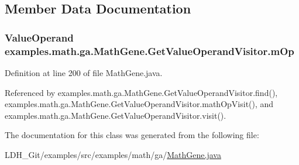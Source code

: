 \subsection{Member Data Documentation}
\hypertarget{classexamples_1_1math_1_1ga_1_1_math_gene_1_1_get_value_operand_visitor_a08a1e2848b038e456b47e8f698fdc182}{
\subsubsection[{m\-Op}]{\setlength{\rightskip}{0pt plus 5cm}Value\-Operand examples.\-math.\-ga.\-Math\-Gene.\-Get\-Value\-Operand\-Visitor.\-m\-Op\hspace{0.3cm}{\ttfamily [private]}}}\label{classexamples_1_1math_1_1ga_1_1_math_gene_1_1_get_value_operand_visitor_a08a1e2848b038e456b47e8f698fdc182}


Definition at line 200 of file Math\-Gene.\-java.



Referenced by examples.\-math.\-ga.\-Math\-Gene.\-Get\-Value\-Operand\-Visitor.\-find(), examples.\-math.\-ga.\-Math\-Gene.\-Get\-Value\-Operand\-Visitor.\-math\-Op\-Visit(), and examples.\-math.\-ga.\-Math\-Gene.\-Get\-Value\-Operand\-Visitor.\-visit().



The documentation for this class was generated from the following file\-:\begin{DoxyCompactItemize}
\item 
L\-D\-H\-\_\-\-Git/examples/src/examples/math/ga/\hyperlink{_math_gene_8java}{Math\-Gene.\-java}\end{DoxyCompactItemize}

